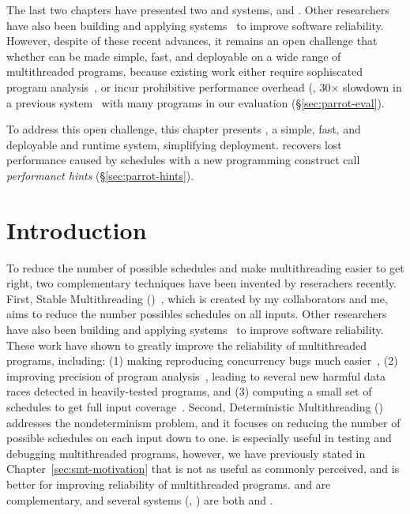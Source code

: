 The last two chapters have presented two \smt and \dmt systems, \tern and
\peregrine. Other researchers have also been building and applying \smt
systems~\cite{determinator:osdi10, dthreads:sosp11, ics:oopsla13} to improve
software reliability. However, despite of these recent advances, it remains an
open challenge that whether \smt can be made simple, fast, and deployable on a
wide range of multithreaded programs, because existing work either require
sophiscated program analysis~\cite{cui:tern:osdi10, peregrine:sosp11,
ics:oopsla13}, or incur prohibitive performance overhead (\eg, 30$\times$
slowdown in a previous system~\cite{dthreads:sosp11} with many programs in our
evaluation (\S\ref{sec:parrot-eval}).

To address this open challenge, this chapter presents \parrot, a simple, fast,
and deployable \smt and \dmt runtime system, simplifying deployment. \parrot
recovers lost performance caused by \smt schedules with a new programming
construct call \emph{performanct hints} (\S\ref{sec:parrot-hints}).

\section{Introduction} \label{sec:parrot-intro}

To reduce the number of possible schedules and make multithreading easier to get
right, two complementary techniques have been invented by reserachers recently.
First, Stable Multithreading (\smt)~\cite{determinator:osdi10, cui:tern:osdi10,
dthreads:sosp11, peregrine:sosp11}, which
is created by my collaborators and me, aims to reduce the number possibles
schedules on all inputs. Other researchers have also been building and applying
\smt
systems~\cite{determinator:osdi10, dthreads:sosp11, ics:oopsla13} to improve
software reliability. These work have shown to greatly improve the
reliability of multithreaded programs, including: (1) making reproducing
concurrency bugs much easier~\cite{cui:tern:osdi10, peregrine:sosp11}, (2)
improving precision of program analysis~\cite{peregrine:sosp11, wu:pldi12},
leading to several new harmful data races detected in heavily-tested programs,
and (3) computing a small set of schedules to get full input
coverage~\cite{ics:oopsla13}.
Second, Deterministic Multithreading
(\dmt)~\cite{dmp:asplos09,kendo:asplos09,coredet:asplos10,
dos:osdi10,grace:oopsla09} addresses the nondeterminism problem, and it focuses
on reducing the number of possible schedules on each input down to one. \dmt is
especially useful in testing and debugging multithreaded programs, however, we
have previously stated in Chapter~\ref{sec:smt-motivation} that \dmt is not as
useful as commonly perceived, and \smt is better for improving reliability of
multithreaded programs. \smt and \dmt are complementary, and several systems
(\eg, \cite{determinator:osdi10, dthreads:sosp11, cui:tern:osdi10,
peregrine:sosp11}) are both \smt and \dmt.

